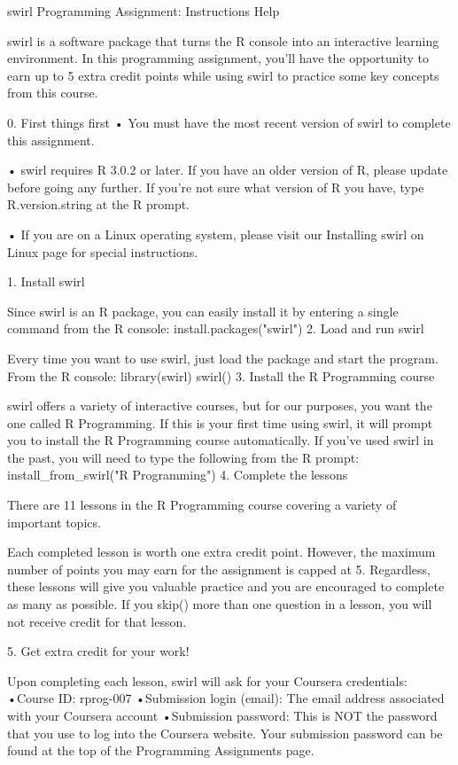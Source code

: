 swirl Programming Assignment: Instructions Help 



swirl is a software package that turns the R console into an interactive learning environment. In this programming assignment, you'll have the opportunity to earn up to 5 extra credit points while using swirl to practice some key concepts from this course.
 
0. First things first
 •
You must have the most recent version of swirl to complete this assignment.
 
•
swirl requires R 3.0.2 or later. If you have an older version of R, please update before going any further. If you're not sure what version of R you have, type R.version.string at the R prompt.
 
•
If you are on a Linux operating system, please visit our Installing swirl on Linux page for special instructions.
 

1. Install swirl
 
Since swirl is an R package, you can easily install it by entering a single command from the R console:
 install.packages("swirl") 
2. Load and run swirl
 
Every time you want to use swirl, just load the package and start the program. From the R console:
 library(swirl)
swirl() 
3. Install the R Programming course
 
swirl offers a variety of interactive courses, but for our purposes, you want the one called R Programming. If this is your first time using swirl, it will prompt you to install the R Programming course automatically. If you've used swirl in the past, you will need to type the following from the R prompt:
 install_from_swirl("R Programming") 
4. Complete the lessons
 
There are 11 lessons in the R Programming course covering a variety of important topics.
 
Each completed lesson is worth one extra credit point. However, the maximum number of points you may earn for the assignment is capped at 5. Regardless, these lessons will give you valuable practice and you are encouraged to complete as many as possible. If you skip() more than one question in a lesson, you will not receive credit for that lesson.
 
5. Get extra credit for your work!
 
Upon completing each lesson, swirl will ask for your Coursera credentials:
 •Course ID: rprog-007
 •Submission login (email): The email address associated with your Coursera account
 •Submission password: This is NOT the password that you use to log into the Coursera website. Your submission password can be found at the top of the Programming Assignments page.
 
